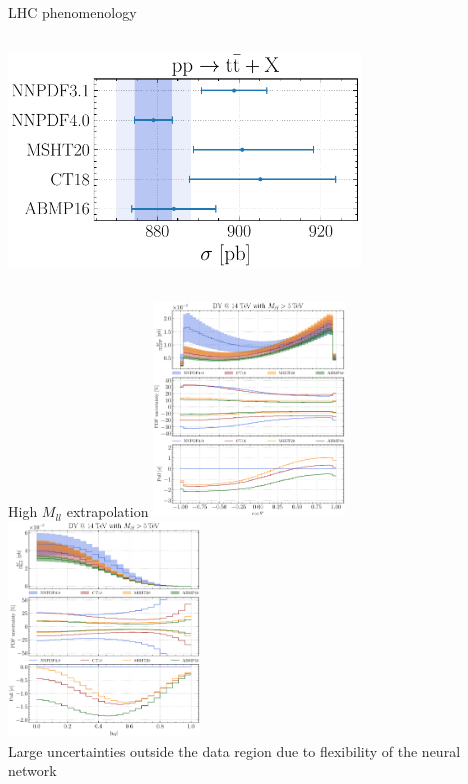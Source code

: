 \documentclass[aspectratio=169,9pt]{beamer}
\begin{document}
\begin{frame}[t]{LHC phenomenology}
\begin{center}
\begin{columns}
\begin{column}{0.48\textwidth}
                    \includegraphics[width=0.7\textwidth]{NNPDF_TTB_14TEV_40_PHENO-integrated}
            \end{column}
        \end{columns}
    \end{center}
\end{frame}


\begin{frame}{High $M_{ll}$ extrapolation}
    \centering
    \includegraphics[width=0.38\textwidth]{CMS_DY_14TEV_MLL_5000_COSTH}
    \hspace*{0.02\textwidth}
    \includegraphics[width=0.38\textwidth]{CMS_DY_14TEV_MLL_5000_YLL}\\
    Large uncertainties outside the data region due to flexibility of the neural network
\end{frame}
\end{document}

